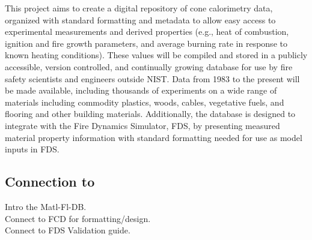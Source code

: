 This project aims to create a digital repository of cone calorimetry data, organized with standard formatting and metadata to allow easy access to experimental measurements and derived properties (e.g., heat of combustion, ignition and fire growth parameters, and average burning rate in response to known heating conditions). These values will be compiled and stored in a publicly accessible, version controlled, and continually growing database for use by fire safety scientists and engineers outside NIST. Data from 1983 to the present will be made available, including thousands of experiments on a wide range of materials including commodity plastics, woods, cables, vegetative fuels, and flooring and other building materials. Additionally, the database is designed to integrate with the Fire Dynamics Simulator, FDS, by presenting measured material property information with standard formatting needed for use as model inputs in FDS. 

\subsection{Connection to } \label{ssec:intro-databases}

Intro the Matl-Fl-DB. \\
Connect to FCD for formatting/design.\\
Connect to FDS Validation guide.
